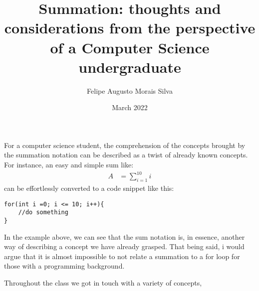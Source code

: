 \documentclass{article}
\title{Summation: thoughts and considerations from the perspective of a Computer Science undergraduate}
\author{Felipe  Augusto Morais Silva}
\date{March 2022}
\begin{document}
\maketitle
For a computer science student, the comprehension of the concepts brought by the summation notation can be described as a twist of already known concepts.
For instance, an easy and simple sum like:
\begin{align*}
  A &= \sum_{i=1}^{10} i
\end{align*}
can be effortlessly converted to a code snippet like this:
\begin{lstlisting}
for(int i =0; i <= 10; i++){
    //do something
}
\end{lstlisting}
In the example above, we can see that the sum notation is, in essence, another way of describing a concept we have already grasped. That being said, i would argue that it is almost impossible to not relate a summation to a for loop for those with a programming background.

Throughout the class we got in touch with a variety of concepts, 
\end{document}
